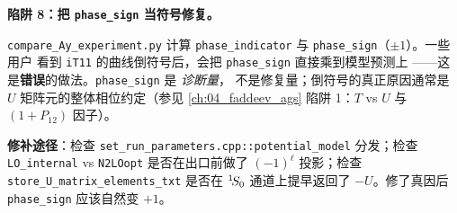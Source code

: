 \begin{pitfallbox}
\textbf{陷阱 8：把 \texttt{phase\_sign} 当符号修复。}

\texttt{compare\_Ay\_experiment.py} 计算
\texttt{phase\_indicator} 与 \texttt{phase\_sign}（\(\pm 1\)）。一些用户
看到 \texttt{iT11} 的曲线倒符号后，会把 \texttt{phase\_sign} 直接乘到模型预测上
——这是\textbf{错误}的做法。\texttt{phase\_sign} 是 \emph{诊断量}，
不是修复量；倒符号的真正原因通常是 \(U\) 矩阵元的整体相位约定（参见
\cref{ch:04_faddeev_ags} 陷阱 1：\(T\) vs \(U\) 与 \((1 + P_{12})\) 因子）。

\textbf{修补途径}：检查 \texttt{set\_run\_parameters.cpp::potential\_model}
分发；检查 \texttt{LO\_internal} vs \texttt{N2LOopt} 是否在出口前做了
\((-1)^\ell\) 投影；检查 \texttt{store\_U\_matrix\_elements\_txt} 是否在
\({}^{1}\!S_{0}\) 通道上提早返回了 \(-U\)。修了真因后 \texttt{phase\_sign}
应该自然变 \(+1\)。
\end{pitfallbox}
